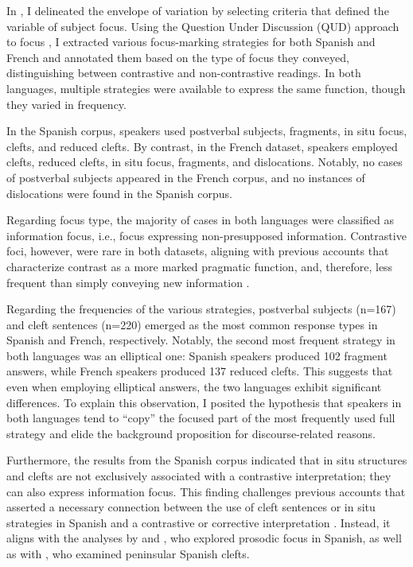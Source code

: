 In , I delineated the envelope of variation by selecting criteria that defined the variable of subject focus. Using the Question Under Discussion (QUD) approach to focus \parencite{roberts1996information, buring2003d, beaver2009sense}, I extracted various focus-marking strategies for both Spanish and French and annotated them based on the type of focus they conveyed, distinguishing between contrastive and non-contrastive readings. In both languages, multiple strategies were available to express the same function, though they varied in frequency.

In the Spanish corpus, speakers used postverbal subjects, fragments, in situ focus, clefts, and reduced clefts. By contrast, in the French dataset, speakers employed clefts, reduced clefts, in situ focus, fragments, and dislocations. Notably, no cases of postverbal subjects appeared in the French corpus, and no instances of dislocations were found in the Spanish corpus.

Regarding focus type, the majority of cases in both languages were classified as information focus, i.e., focus expressing non-presupposed information. Contrastive foci, however, were rare in both datasets, aligning with previous accounts that characterize contrast as a more marked pragmatic function, and, therefore, less frequent than simply conveying new information \parencite{zimmermann2011focus}.

Regarding the frequencies of the various strategies, postverbal subjects (n=167) and cleft sentences (n=220) emerged as the most common response types in Spanish and French, respectively. Notably, the second most frequent strategy in both languages was an elliptical one: Spanish speakers produced 102 fragment answers, while French speakers produced 137 reduced clefts. This suggests that even when employing elliptical answers, the two languages exhibit significant differences.
To explain this observation, I posited the hypothesis that speakers in both languages tend to ``copy” the focused part of the most frequently used full strategy and elide the background proposition for discourse-related reasons.

Furthermore, the results from the Spanish corpus indicated that in situ structures and clefts are not exclusively associated with a contrastive interpretation; they can also express information focus. This finding challenges previous accounts that asserted a necessary connection between the use of cleft sentences or in situ strategies in Spanish and a contrastive or corrective interpretation \parencite{lambrecht1996information, zubizarreta1998prosody}. Instead, it aligns with the analyses by \textcite{fery2001focus} and \textcite{gabriel2007fokus}, who explored prosodic focus in Spanish, as well as with \textcite{feldhausen2015oraciones}, who examined peninsular Spanish clefts.

